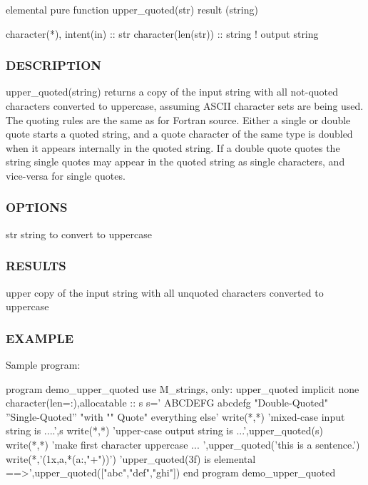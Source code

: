 \begin{DoxyVerb}elemental pure function upper_quoted(str) result (string)

 character(*), intent(in)    :: str
 character(len(str))         :: string  ! output string
\end{DoxyVerb}
 \subsubsection*{D\+E\+S\+C\+R\+I\+P\+T\+I\+ON}

upper\+\_\+quoted(string) returns a copy of the input string with all not-\/quoted characters converted to uppercase, assuming A\+S\+C\+II character sets are being used. The quoting rules are the same as for Fortran source. Either a single or double quote starts a quoted string, and a quote character of the same type is doubled when it appears internally in the quoted string. If a double quote quotes the string single quotes may appear in the quoted string as single characters, and vice-\/versa for single quotes.

\subsubsection*{O\+P\+T\+I\+O\+NS}

str string to convert to uppercase

\subsubsection*{R\+E\+S\+U\+L\+TS}

upper copy of the input string with all unquoted characters converted to uppercase

\subsubsection*{E\+X\+A\+M\+P\+LE}

Sample program\+: \begin{DoxyVerb} program demo_upper_quoted
 use M_strings, only: upper_quoted
 implicit none
 character(len=:),allocatable  :: s
 s=' ABCDEFG abcdefg "Double-Quoted" ''Single-Quoted'' "with "" Quote" everything else'
    write(*,*) 'mixed-case input string is ....',s
    write(*,*) 'upper-case output string is ...',upper_quoted(s)
    write(*,*) 'make first character uppercase  ... ',upper_quoted('this is a sentence.')
    write(*,'(1x,a,*(a:,"+"))') 'upper_quoted(3f) is elemental ==>',upper_quoted(["abc","def","ghi"])
 end program demo_upper_quoted
\end{DoxyVerb}



